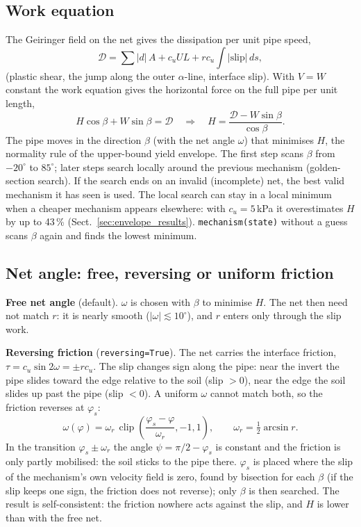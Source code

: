 \documentclass[11pt,a4paper]{article}
\begin{document}
\subsection{Work equation}

The Geiringer field on the net gives the dissipation per unit pipe
speed,
\begin{equation}
  \mathcal{D} = \sum |d|\,A + c_u U L + r c_u \int |\text{slip}|\,ds,
\end{equation}
(plastic shear, the jump along the outer $\alpha$-line, interface
slip).  With $V = W$ constant the work equation gives the horizontal
force on the full pipe per unit length,
\begin{equation}
  H\cos\beta + W\sin\beta = \mathcal{D}
  \quad\Longrightarrow\quad
  H = \frac{\mathcal{D} - W\sin\beta}{\cos\beta}.
\end{equation}
The pipe moves in the direction $\beta$ (with the net angle $\omega$)
that minimises $H$, the normality rule of the upper-bound yield
envelope.  The first step scans $\beta$ from $-20^\circ$ to $85^\circ$;
later steps search locally around the previous mechanism
(golden-section search).  If the search ends on an invalid
(incomplete) net, the best valid mechanism it has seen is used.  The
local search can stay in a local minimum when a cheaper mechanism
appears elsewhere: with $c_u = 5$\,kPa it overestimates $H$ by up to
43\,\% (Sect.~\ref{sec:envelope_results}).  \texttt{mechanism(state)}
without a guess scans $\beta$ again and finds the lowest minimum.

\subsection{Net angle: free, reversing or uniform friction}

\textbf{Free net angle} (default).  $\omega$ is chosen with $\beta$ to
minimise $H$.  The net then need not match $r$: it is nearly smooth
($|\omega| \lesssim 10^\circ$), and $r$ enters only through the slip
work.

\textbf{Reversing friction} (\texttt{reversing=True}).  The net carries
the interface friction, $\tau = c_u\sin2\omega = \pm r c_u$.  The slip
changes sign along the pipe: near the invert the pipe slides toward
the edge relative to the soil (slip $> 0$), near the edge the soil
slides up past the pipe (slip $< 0$).  A uniform $\omega$ cannot
match both, so the friction reverses at $\varphi_s$:
\begin{equation}
  \omega(\varphi) = \omega_r\,
  \operatorname{clip}\!\left(\frac{\varphi_s - \varphi}{\omega_r}, -1, 1\right),
  \qquad \omega_r = \tfrac12\arcsin r .
\end{equation}
In the transition $\varphi_s \pm \omega_r$ the angle
$\psi = \pi/2 - \varphi_s$ is constant and the friction is only partly
mobilised: the soil sticks to the pipe there.  $\varphi_s$ is placed
where the slip of the mechanism's own velocity field is zero, found by
bisection for each $\beta$ (if the slip keeps one sign, the friction
does not reverse); only $\beta$ is then searched.  The result is
self-consistent: the friction nowhere acts against the slip, and $H$
is lower than with the free net.
\end{document}
